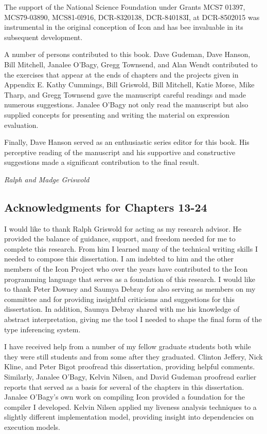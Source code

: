 The support of the National Science Foundation under Grants MCS7
01397, MCS79-03890, MCS81-0l916, DCR-8320138, DCR-840183I, at
DCR-8502015 was instrumental in the original conception of Icon and
has bee invaluable in its subsequent development.

A number of persons contributed to this book. Dave Gudeman, Dave
Hanson, Bill Mitchell, Janalee O'Bagy, Gregg Townsend, and Alan Wendt
contributed to the exercises that appear at the ends of chapters and
the projects given in Appendix E. Kathy Cummings, Bill Griswold, Bill
Mitchell, Katie Morse, Mike Tharp, and Gregg Townsend gave the
manuscript careful readings and made numerous suggestions. Janalee
O'Bagy not only read the manuscript but also supplied concepts for
presenting and writing the material on expression evaluation.

Finally, Dave Hanson served as an enthusiastic series editor for this
book. His perceptive reading of the manuscript and his supportive
and constructive suggestions made a significant contribution to the
final result.

\hfill {\em Ralph and Madge Griswold}


\subsection*{Acknowledgments for Chapters 13-24}

I would like to thank Ralph Griswold for acting as my research
advisor. He provided the balance of guidance, support, and freedom
needed for me to complete this research. From him I learned many of
the technical writing skills I needed to compose this dissertation. I
am indebted to him and the other members of the Icon Project who over
the years have contributed to the Icon programming language that
serves as a foundation of this research. I would like to thank Peter
Downey and Saumya Debray for also serving as members on my committee
and for providing insightful criticisms and suggestions for this
dissertation. In addition, Saumya Debray shared with me his knowledge
of abstract interpretation, giving me the tool I needed to shape the
final form of the type inferencing system.

I have received help from a number of my fellow graduate students
both while they were still students and from some after they
graduated. Clinton Jeffery, Nick Kline, and Peter Bigot proofread this
dissertation, providing helpful comments. Similarly, Janalee O'Bagy,
Kelvin Nilsen, and David Gudeman proofread earlier reports that served
as a basis for several of the chapters in this dissertation. Janalee
O'Bagy's own work on compiling Icon provided a foundation for the
compiler I developed. Kelvin Nilsen applied my liveness analysis
techniques to a slightly different implementation model, providing
insight into dependencies on execution models.
